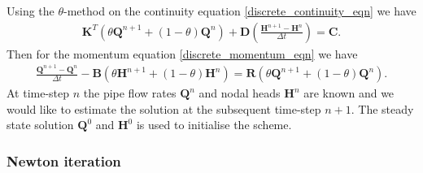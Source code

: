 \documentclass[12pt]{article}
\begin{document}
Using the $\theta$-method on the continuity equation \eqref{discrete_continuity_eqn} we have
\begin{align}
\mathbf{K}^T \left( \theta \mathbf{Q}^{n+1} + (1-\theta)\mathbf{Q}^{n} \right) + \mathbf{D} \left( \frac{\mathbf{H}^{n+1} - \mathbf{H}^{n}}{\Delta t} \right) = \mathbf{C}.
\end{align}
Then for the momentum equation \eqref{discrete_momentum_eqn} we have
\begin{align}
\frac{\mathbf{Q}^{n+1} - \mathbf{Q}^{n}}{\Delta t} -\mathbf{B} \left( \theta \mathbf{H}^{n+1} + (1-\theta)\mathbf{H}^{n} \right) = \mathbf{R}\left( \theta \mathbf{Q}^{n+1} + (1-\theta)\mathbf{Q}^{n} \right).
\end{align}
At time-step $n$ the pipe flow rates $\mathbf{Q}^{n}$ and nodal heads $\mathbf{H}^{n}$ are known and we would like to estimate the solution at the subsequent time-step $n+1$. The steady state solution $\mathbf{Q}^{0}$ and $\mathbf{H}^{0}$ is used to initialise the scheme.

\subsubsection{Newton iteration} 
\end{document}
